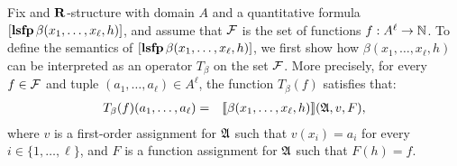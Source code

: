 Fix and $\mathbf{R}$-structure with domain $A$ and a quantitative formula $[{\bf lsfp} \, \beta(x_1,\ldots,x_\ell,h)]$, and assume that $\F$ is the set of functions $f :A^\ell \to \mathbb{N}$. To define the semantics of $[{\bf lsfp} \, \beta(x_1,\ldots,x_\ell,h)]$, we first show how $\beta(x_1,\ldots,x_\ell,h)$ can be interpreted as an operator $T_{\beta}$ on the set $\F$. More precisely, for every $f \in \F$ and tuple $(a_1, \ldots, a_\ell) \in A^\ell$, the function $T_{\beta}(f)$ satisfies that:
\begin{eqnarray*}
T_{\beta}(f)(a_1, \ldots, a_\ell) & = & {\llbracket{}{\beta(x_1, \ldots, x_\ell, h)}\rrbracket}(\mathfrak{A},v,F),
\end{eqnarray*}
where $v$ is a first-order assignment  for $\mathfrak{A}$ such that $v(x_i) = a_i$ for every $i \in \{1, \ldots, \ell\}$, and $F$ is a function assignment for $\mathfrak{A}$ such that $F(h) = f$. 

